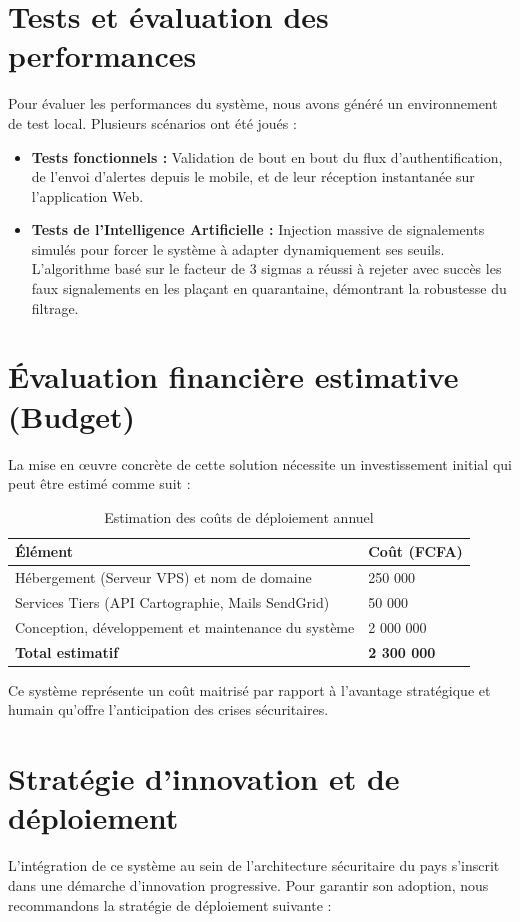 \documentclass[12pt,a4paper]{article}
\begin{document}
\section{Tests et évaluation des performances}
Pour évaluer les performances du système, nous avons généré un environnement de test local. Plusieurs scénarios ont été joués :
\begin{itemize}
    \item \textbf{Tests fonctionnels :} Validation de bout en bout du flux d'authentification, de l'envoi d'alertes depuis le mobile, et de leur réception instantanée sur l'application Web.
    \item \textbf{Tests de l'Intelligence Artificielle :} Injection massive de signalements simulés pour forcer le système à adapter dynamiquement ses seuils. L'algorithme basé sur le facteur de 3 sigmas a réussi à rejeter avec succès les faux signalements en les plaçant en quarantaine, démontrant la robustesse du filtrage.
\end{itemize}

\section{Évaluation financière estimative (Budget)}
La mise en œuvre concrète de cette solution nécessite un investissement initial qui peut être estimé comme suit :

\begin{table}[H]
\centering
\caption{Estimation des coûts de déploiement annuel}
\begin{tabular}{|l|l|}
\hline
\textbf{Élément} & \textbf{Coût (FCFA)} \\
\hline
Hébergement (Serveur VPS) et nom de domaine & 250 000 \\
\hline
Services Tiers (API Cartographie, Mails SendGrid) & 50 000 \\
\hline
Conception, développement et maintenance du système & 2 000 000 \\
\hline
\textbf{Total estimatif} & \textbf{2 300 000} \\
\hline
\end{tabular}
\end{table}

Ce système représente un coût maitrisé par rapport à l'avantage stratégique et humain qu'offre l'anticipation des crises sécuritaires.

\section{Stratégie d’innovation et de déploiement}
L'intégration de ce système au sein de l'architecture sécuritaire du pays s'inscrit dans une démarche d'innovation progressive. Pour garantir son adoption, nous recommandons la stratégie de déploiement suivante :
\end{document}
